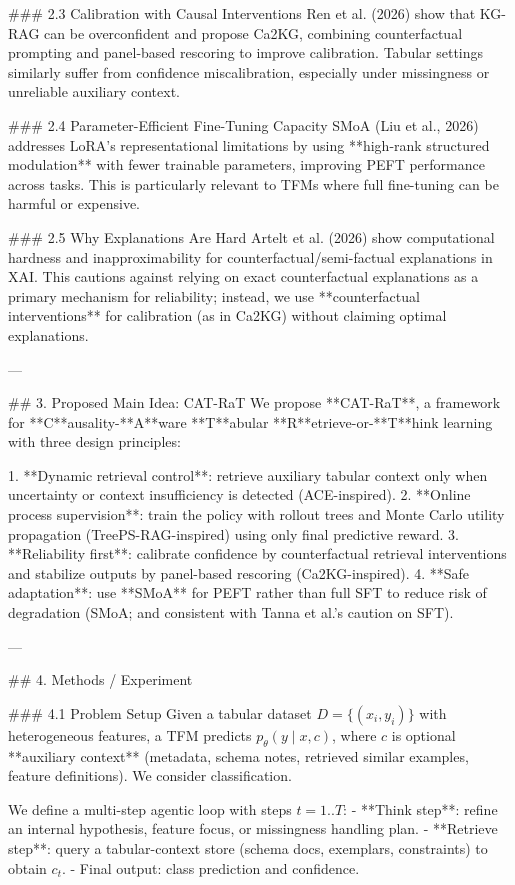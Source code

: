 ### 2.3 Calibration with Causal Interventions  
Ren et al. (2026) show that KG-RAG can be overconfident and propose Ca2KG, combining counterfactual prompting and panel-based rescoring to improve calibration. Tabular settings similarly suffer from confidence miscalibration, especially under missingness or unreliable auxiliary context.

### 2.4 Parameter-Efficient Fine-Tuning Capacity  
SMoA (Liu et al., 2026) addresses LoRA’s representational limitations by using **high-rank structured modulation** with fewer trainable parameters, improving PEFT performance across tasks. This is particularly relevant to TFMs where full fine-tuning can be harmful or expensive.

### 2.5 Why Explanations Are Hard  
Artelt et al. (2026) show computational hardness and inapproximability for counterfactual/semi-factual explanations in XAI. This cautions against relying on exact counterfactual explanations as a primary mechanism for reliability; instead, we use **counterfactual interventions** for calibration (as in Ca2KG) without claiming optimal explanations.

---

## 3. Proposed Main Idea: CAT-RaT  
We propose **CAT-RaT**, a framework for **C**ausality-**A**ware **T**abular **R**etrieve-or-**T**hink learning with three design principles:

1. **Dynamic retrieval control**: retrieve auxiliary tabular context only when uncertainty or context insufficiency is detected (ACE-inspired).  
2. **Online process supervision**: train the policy with rollout trees and Monte Carlo utility propagation (TreePS-RAG-inspired) using only final predictive reward.  
3. **Reliability first**: calibrate confidence by counterfactual retrieval interventions and stabilize outputs by panel-based rescoring (Ca2KG-inspired).  
4. **Safe adaptation**: use **SMoA** for PEFT rather than full SFT to reduce risk of degradation (SMoA; and consistent with Tanna et al.’s caution on SFT).

---

## 4. Methods / Experiment  

### 4.1 Problem Setup  
Given a tabular dataset \(D = \{(x_i, y_i)\}\) with heterogeneous features, a TFM predicts \(p_\theta(y \mid x, c)\), where \(c\) is optional **auxiliary context** (metadata, schema notes, retrieved similar examples, feature definitions). We consider classification.

We define a multi-step agentic loop with steps \(t=1..T\):  
- **Think step**: refine an internal hypothesis, feature focus, or missingness handling plan.  
- **Retrieve step**: query a tabular-context store (schema docs, exemplars, constraints) to obtain \(c_t\).  
- Final output: class prediction and confidence.

